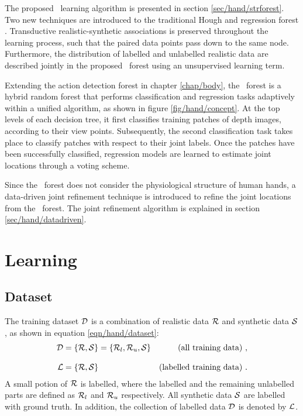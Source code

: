 The proposed \STR\ learning algorithm is presented in section \ref{sec/hand/strforest}.
Two new techniques are introduced to the traditional Hough and regression forest \cite{Gall2011}. 
Transductive realistic-synthetic associations is preserved throughout the learning process, such that the paired data points pass down to the same node. 
Furthermore, the distribution of labelled and unlabelled realistic data are described jointly in the proposed \STR\ forest using an unsupervised learning term. 

Extending the action detection forest in chapter \ref{chap/body}, the \STR\ forest is a hybrid random forest that performs classification and regression tasks adaptively within a unified algorithm, as shown in figure \ref{fig/hand/concept}. At the top levels of each decision tree, it first classifies training patches of depth images, according to their view points. Subsequently, the second classification task takes place to classify patches with respect to their joint labels. Once the patches have been successfully classified, regression models are learned to estimate joint locations through a voting scheme.  

Since the \STR\ forest does not consider the physiological structure of human hands, a data-driven joint refinement technique is introduced to refine the joint locations from the \STR\ forest. 
The joint refinement algorithm is explained in section \ref{sec/hand/datadriven}.


\section{Learning} 

\subsection{Dataset}
\label{sec/hand/dataset} 

The training dataset $\mathcal{D}$ is a combination of realistic data $\mathcal{R}$ and synthetic data $\mathcal{S}$, as shown in equation \ref{eqn/hand/dataset}: 
\begin{equation}
	\label{eqn/hand/dataset} 
	\begin{aligned}
		\mathcal{D} 	& = \left\{ \mathcal{R}, \mathcal{S} \right\} = \left\{ \mathcal{R}_{l}, \mathcal{R}_{u}, \mathcal{S} \right\} & \mbox{(all training data) }, \\[3mm]
		\mathcal{L} 		& = \left\{ \mathcal{R}, \mathcal{S} \right\} & \mbox{(labelled training data) }. \\ 
	\end{aligned}
\end{equation}
A small potion of $\mathcal{R}$ is labelled, where the labelled and the remaining unlabelled parts are defined as $\mathcal{R}_{l}$ and $\mathcal{R}_{u}$ respectively. All synthetic data $\mathcal{S}$ are labelled with ground truth. In addition, the collection of labelled data $\mathcal{D}$ is denoted by $\mathcal{L}$.  

